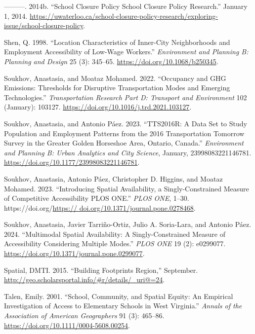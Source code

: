 \documentclass[
default
]{sn-jnl}
\newlength{\cslhangindent}
\newenvironment{CSLReferences}[2] %
 {\begin{list}{}{%
  \setlength{\itemindent}{0pt}
  \setlength{\leftmargin}{0pt}
  \setlength{\parsep}{0pt}
  \ifodd #1
   \setlength{\leftmargin}{\cslhangindent}
   \setlength{\itemindent}{-1\cslhangindent}
  \fi
  \setlength{\itemsep}{#2\baselineskip}}}
 {\end{list}}
\begin{document}
\begin{CSLReferences}{1}{0}
---------. 2014b. {``School Closure Policy {\textbar} School Closure
Policy Research.''} January 1, 2014.
\url{https://uwaterloo.ca/school-closure-policy-research/exploring-issue/school-closure-policy}.

Shen, Q. 1998. {``Location Characteristics of Inner-City Neighborhoods
and Employment Accessibility of Low-Wage Workers.''} \emph{Environment
and Planning B: Planning and Design} 25 (3): 345--65.
\url{https://doi.org/10.1068/b250345}.

Soukhov, Anastasia, and Moataz Mohamed. 2022. {``Occupancy and {GHG}
Emissions: Thresholds for Disruptive Transportation Modes and Emerging
Technologies.''} \emph{Transportation Research Part D: Transport and
Environment} 102 (January): 103127.
\url{https://doi.org/10.1016/j.trd.2021.103127}.

Soukhov, Anastasia, and Antonio Páez. 2023. {``{TTS}2016R: A Data Set to
Study Population and Employment Patterns from the 2016 Transportation
Tomorrow Survey in the Greater Golden Horseshoe Area, Ontario,
Canada.''} \emph{Environment and Planning B: Urban Analytics and City
Science}, January, 23998083221146781.
\url{https://doi.org/10.1177/23998083221146781}.

Soukhov, Anastasia, Antonio Páez, Christopher D. Higgins, and Moataz
Mohamed. 2023. {``Introducing Spatial Availability, a Singly-Constrained
Measure of Competitive Accessibility \textbar{} {PLOS ONE}.''}
\emph{PLOS ONE}, 1--30.
https://doi.org/\href{https://\%20doi.org/10.1371/journal.pone.0278468}{https://
doi.org/10.1371/journal.pone.0278468}.

Soukhov, Anastasia, Javier Tarriño-Ortiz, Julio A. Soria-Lara, and
Antonio Páez. 2024. {``Multimodal Spatial Availability: A
Singly-Constrained Measure of Accessibility Considering Multiple
Modes.''} \emph{{PLOS} {ONE}} 19 (2): e0299077.
\url{https://doi.org/10.1371/journal.pone.0299077}.

Spatial, DMTI. 2015. {``Building Footprints Region,''} September.
\url{http://geo.scholarsportal.info/\#r/details/_uri@=24}.

Talen, Emily. 2001. {``School, Community, and Spatial Equity: An
Empirical Investigation of Access to Elementary Schools in West
Virginia.''} \emph{Annals of the Association of American Geographers} 91
(3): 465--86. \url{https://doi.org/10.1111/0004-5608.00254}.


\end{CSLReferences}
\end{document}
